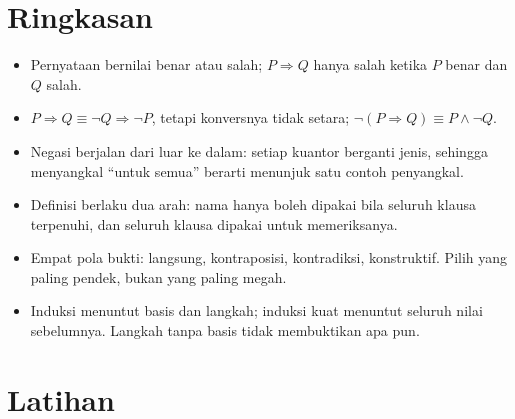 \section{Ringkasan}

\begin{ringkasan}
\begin{itemize}
  \item Pernyataan bernilai benar atau salah; $P \Rightarrow Q$ hanya salah ketika $P$
        benar dan $Q$ salah.
  \item $P \Rightarrow Q \equiv \neg Q \Rightarrow \neg P$, tetapi konversnya tidak
        setara; $\neg(P \Rightarrow Q) \equiv P \wedge \neg Q$.
  \item Negasi berjalan dari luar ke dalam: setiap kuantor berganti jenis, sehingga
        menyangkal ``untuk semua'' berarti menunjuk satu contoh penyangkal.
  \item Definisi berlaku dua arah: nama hanya boleh dipakai bila seluruh klausa
        terpenuhi, dan seluruh klausa dipakai untuk memeriksanya.
  \item Empat pola bukti: langsung, kontraposisi, kontradiksi, konstruktif. Pilih
        yang paling pendek, bukan yang paling megah.
  \item Induksi menuntut basis dan langkah; induksi kuat menuntut seluruh nilai
        sebelumnya. Langkah tanpa basis tidak membuktikan apa pun.
\end{itemize}
\end{ringkasan}

\section{Latihan}

